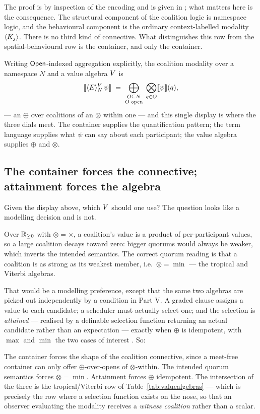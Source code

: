 The proof is by inspection of the encoding and is given in \cite{QuorumNote}; what
matters here is the consequence. The structural component of the coalition logic
is namespace logic, and the behavioural component is the ordinary
context-labelled modality $\langle K_{j}\rangle$. There is no third kind of
connective. What distinguishes this row from the spatial-behavioural row is the
container, and only the container.

Writing $\mathsf{Open}$-indexed aggregation explicitly, the coalition modality over a
namespace $N$ and a value algebra $V$ is
\[
  \llbracket \langle E \rangle_{N}^{V}\, \psi \rrbracket
  \;=\;
  \bigoplus_{\substack{O \subseteq N \\ O \text{ open}}}\;
  \bigotimes_{q \in O} \llbracket \psi \rrbracket(q),
\]
--- an $\oplus$ over coalitions of an $\otimes$ within one --- and this single
display is where the three dials meet. The container supplies the quantification
pattern; the term language supplies what $\psi$ can say about each participant;
the value algebra supplies $\oplus$ and $\otimes$.

\subsection{The container forces the connective; attainment forces the algebra}

Given the display above, which $V$ should one use? The question looks like a
modelling decision and is not.

Over $\mathbb{R}_{\ge0}$ with $\otimes = \times$, a coalition's value is a product of
per-participant values, so a large coalition decays toward zero: bigger quorums
would always be weaker, which inverts the intended semantics. The correct quorum
reading is that a coalition is as strong as its weakest member, i.e.\ $\otimes =
\min$ --- the tropical and Viterbi algebras.

That would be a modelling preference, except that the same two algebras are picked
out independently by a condition in Part V. A graded clause assigns a value to
each candidate; a scheduler must actually select one; and the selection is
\emph{attained} --- realised by a definable selection function returning an actual
candidate rather than an expectation --- exactly when $\oplus$ is idempotent, with
$\max$ and $\min$ the two cases of interest \cite{ChoiceFormulae}. So:

\begin{observation}
\label{obs:threeconstraints}
The container forces the shape of the coalition connective, since a meet-free
container can only offer $\oplus$-over-opens of $\otimes$-within. The intended
quorum semantics forces $\otimes = \min$. Attainment forces $\oplus$ idempotent.
The intersection of the three is the tropical/Viterbi row of
Table~\ref{tab:valuealgebras} --- which is precisely the row where a selection
function exists on the nose, so that an observer evaluating the modality receives
a \emph{witness coalition} rather than a scalar.
\end{observation}

